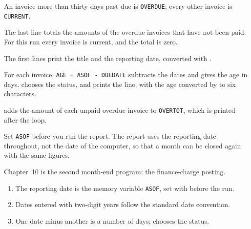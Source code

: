 An invoice more than thirty days past due is
\texttt{OVERDUE}; every other invoice is \texttt{CURRENT}.

The last line totals the amounts of the overdue invoices that
have not been paid.  For this run every invoice is current, and the total is
zero.

The first lines print the title and the reporting date,
converted with .

For each invoice, \texttt{AGE = ASOF - DUEDATE} subtracts the
dates and gives the age in days.   chooses the status, and 
prints the line, with the age converted by  to six characters.

 adds the amount of each
unpaid overdue invoice to \texttt{OVERTOT}, which is printed after the loop.

\begin{AteNote}
Set \texttt{ASOF} before you run the report.  The report uses the reporting date
throughout, not the date of the computer, so that a month can be closed again
with the same figures.
\end{AteNote}

Chapter~10 is the second month-end program: the finance-charge posting.

\begin{enumerate}
\item The reporting date is the memory variable \texttt{ASOF}, set with
   before the run.
\item Dates entered with two-digit years follow the standard date convention.
\item One date minus another is a number of days;  chooses the status.
\end{enumerate}
